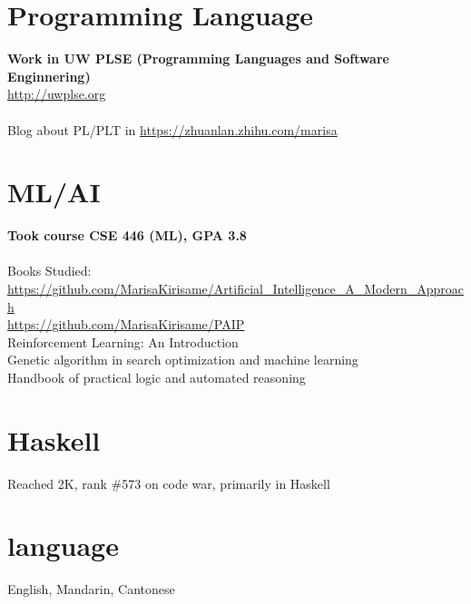 \documentclass[margin,line]{res}
\begin{document}
\begin{resume}
\section{\sc Programming Language}
\textbf{Work in UW PLSE (Programming Languages and Software Enginnering)} \\
\url{http://uwplse.org}
\\
\\
Blog about PL/PLT in \url{https://zhuanlan.zhihu.com/marisa}

\section{ML/AI}
\textbf{Took course CSE 446 (ML), GPA 3.8} \\
\\
Books Studied: \\
\url{https://github.com/MarisaKirisame/Artificial_Intelligence_A_Modern_Approach} \\
\url{https://github.com/MarisaKirisame/PAIP} \\
Reinforcement Learning: An Introduction \\
Genetic algorithm in search optimization and machine learning \\
Handbook of practical logic and automated reasoning

\section{\sc Haskell} Reached 2K, rank \#573 on code war, primarily in Haskell

\section{\sc language} English, Mandarin, Cantonese

\vspace*{-.2in}

\end{resume}
\end{document}
